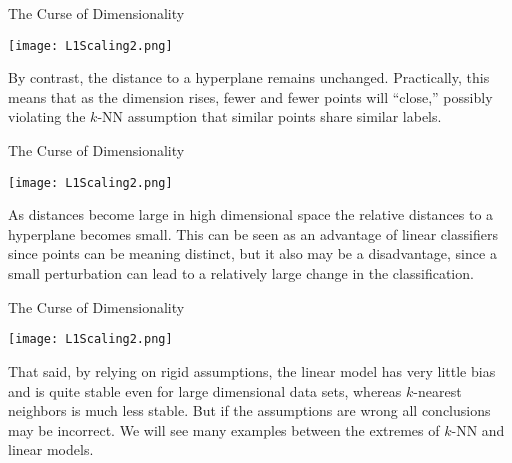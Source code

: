 \documentclass[10pt,handout]{beamer}
\begin{document}
\begin{frame}[fragile]{The Curse of Dimensionality}
   \begin{minipage}[t][0.5\textheight][t]{\textwidth}
    \centering
     \texttt{[image: L1Scaling2.png]}
  \end{minipage}
  \vfill
  \begin{minipage}[t][0.5\textheight][t]{\textwidth}
By contrast, the distance to a hyperplane remains unchanged. Practically, this means that as the dimension rises, fewer and fewer points will ``close,'' possibly violating the $k$-NN assumption that similar points share similar labels. 
 \end{minipage}
\end{frame}


\begin{frame}[fragile]{The Curse of Dimensionality}
   \begin{minipage}[t][0.5\textheight][t]{\textwidth}
    \centering
     \texttt{[image: L1Scaling2.png]}
  \end{minipage}
  \vfill
  \begin{minipage}[t][0.5\textheight][t]{\textwidth}
As distances become large in high dimensional space the relative distances to a hyperplane becomes small. This can be seen as an advantage of linear classifiers since points can be meaning distinct, but it also may be a disadvantage, since a small perturbation can lead to a relatively large change in the classification. 
 \end{minipage}
\end{frame}



\begin{frame}[fragile]{The Curse of Dimensionality}
   \begin{minipage}[t][0.5\textheight][t]{\textwidth}
    \centering
     \texttt{[image: L1Scaling2.png]}
  \end{minipage}
  \vfill
  \begin{minipage}[t][0.5\textheight][t]{\textwidth}
That said, by relying on rigid assumptions, the linear model has very little bias and is quite stable even for large dimensional data sets, whereas $k$-nearest neighbors is much less stable. But if the assumptions are wrong all conclusions may be incorrect. We will see many examples between the extremes of $k$-NN and linear models.  
 \end{minipage}
\end{frame}
\end{document}
